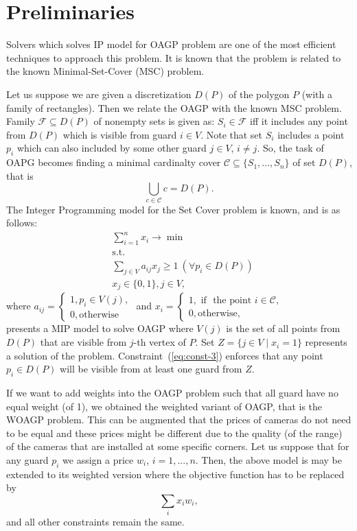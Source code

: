 \documentclass[runningheads,a4paper]{llncs}
\begin{document}
     
     \section{Preliminaries}
     Solvers which solves IP model for OAGP problem are one of the most efficient techniques to approach this problem. It is known that the problem is related to the known Minimal-Set-Cover (MSC) problem.

     Let us suppose we are given a discretization $D(P)$ of the polygon $P$ (with a family of rectangles). Then we relate the OAGP with the known MSC problem.
     Family $\mathcal{F}\subseteq D(P)$ of nonempty sets is given as: $S_i \in \mathcal{F}$ iff it includes any point from $D(P)$ which is visible from guard $i\in V$. Note that set $S_i$ includes a point $p_i$ which can also included by some other guard $j\in V$, $i \neq j$. So, the task of OAPG becomes finding a minimal cardinalty cover $\mathcal{C}\subseteq\{S_1,...,S_n\}$ of set $D(P)$, that is
     $$ \bigcup_{c \in \mathcal{C}} c = D(P).$$ The Integer Programming model for the Set Cover problem is known, and is as follows:
     \begin{align}
        &\sum_{i=1}^n x_i \longrightarrow \min \\
        &\mbox{s.t.} \\
        &\sum_{j\in V} a_{ij}x_j \geq 1\ (\forall p_i\in D(P)) \label{eq:const-3}\\
        & x_j \in \{0,1\}, j \in V,
     \end{align}
     where
     $a_{ij} = \begin{cases}
          1, p_i \in V(j), \\
          0, \mbox{otherwise}
     \end{cases}$
     and $x_i = \begin{cases}
     	 1, \mbox{ if } \mbox{ the point } i \in \mathcal{C},\\
     	 0, \mbox{otherwise},
     \end{cases}$ \\
      presents a MIP model to solve OAGP where $V(j)$ is the set of all points from $D(P)$ that are visible from $j$-th vertex of $P$.
     Set $Z = \{j \in V\mid x_i=1\}$ represents a solution of the problem.
     Constraint~(\ref{eq:const-3}) enforces that any point $p_i \in D(P)$ will be visible from at least one guard from $Z$.

     If we want to add weights into the OAGP problem such that all guard have no equal weight (of 1), we obtained the weighted variant of OAGP, that is the WOAGP problem. This can be augmented that the prices of cameras do not need to be equal and these prices might be different due to the quality (of the range) of the cameras that are installed at some specific corners.  Let us suppose that for any guard $p_i$ we assign a price $w_i$, $i=1,...,n$. Then, the above model is may be extended to its weighted version where the objective function has to be replaced by
     $$ \sum_{i} x_i w_i,$$
      and all other constraints remain the same.
\end{document}

